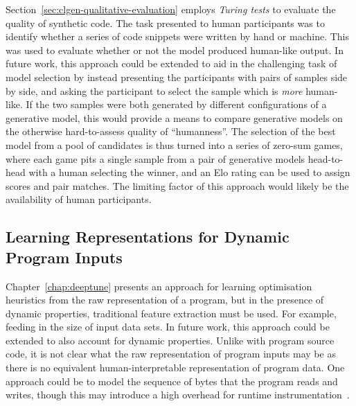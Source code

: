 Section~\ref{sec:clgen-qualitative-evaluation} employs \emph{Turing tests} to evaluate the quality of synthetic code. The task presented to human participants was to identify whether a series of code snippets were written by hand or machine. This was used to evaluate whether or not the model produced human-like output. In future work, this approach could be extended to aid in the challenging task of model selection by instead presenting the participants with pairs of samples side by side, and asking the participant to select the sample which is \emph{more} human-like. If the two samples were both generated by different configurations of a generative model, this would provide a means to compare generative models on the otherwise hard-to-assess quality of ``humanness''. The selection of the best model from a pool of candidates is thus turned into a series of zero-sum games, where each game pits a single sample from a pair of generative models head-to-head with a human selecting the winner, and an Elo rating can be used to assign scores and pair matches. The limiting factor of this approach would likely be the availability of human participants.



\subsection{Learning Representations for Dynamic Program Inputs}

Chapter~\ref{chap:deeptune} presents an approach for learning optimisation heuristics from the raw representation of a program, but in the presence of dynamic properties, traditional feature extraction must be used. For example, feeding in the size of input data sets. In future work, this approach could be extended to also account for dynamic properties. Unlike with program source code, it is not clear what the raw representation of program inputs may be as there is no equivalent human-interpretable representation of program data. One approach could be to model the sequence of bytes that the program reads and writes, though this may introduce a high overhead for runtime instrumentation~\cite{Gad2014}.


